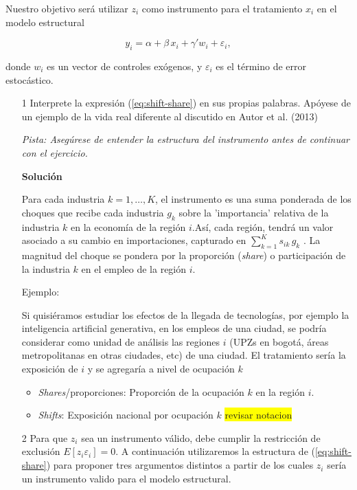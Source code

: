 \documentclass[a4paper, answers, addpoints, 11pt]{exam}
\newenvironment{solucion}{%
  \begin{mdframed}[
    backgroundcolor=blue!5,    %
    linecolor=blue!50,          %
    linewidth=2pt,              %
    leftmargin=10pt,            %
    rightmargin=8pt,           %
    topline=true,              %
    bottomline=true,            %
    roundcorner=10pt,           %
    innerleftmargin=10pt,       %
    innerrightmargin=10pt,      %
    innerbottommargin=10pt,     %
    innertopmargin=10pt         %
  ]%
  \begin{tcolorbox}[colframe=blue!50!black, colback=blue!50, coltitle=white, sharp corners=all, boxrule=1mm, width=\textwidth, halign=left, valign=center, top=0mm, bottom=0mm, left=0mm, right=0mm] \textbf{Solución} \end{tcolorbox} }{\end{mdframed}}
\begin{document}
Nuestro objetivo será utilizar \(z_i\) como instrumento para el tratamiento \(x_i\) en el modelo estructural

\[
y_i = \alpha +\beta\,x_i + \gamma' w_i + \varepsilon_i,
\]

donde \(w_i\) es un vector de controles exógenos, y \(\varepsilon_i\) es el término de error estocástico.

\begin{enumerate}
    \item[1] Interprete la expresión (\ref{eq:shift-share}) en sus propias palabras. Apóyese de un ejemplo de la vida real diferente al discutido en Autor et al. (2013)
    
    
    \textit{Pista: Asegúrese de entender la estructura del instrumento antes de continuar con el ejercicio.}
\begin{solucion}
Para cada industria $k=1,\dots,K$, el instrumento es una suma ponderada de los choques que recibe cada industria $g_k$ sobre la 'importancia'  relativa de la industria $k$ en la economía de la región $i$.Así, cada región, tendrá un valor asociado a su cambio en importaciones, capturado en $\sum_{k=1}^{K} s_{ik}\,g_k$ . La magnitud del choque se pondera por la proporción (\textit{share}) o participación de la industria $k$ en el empleo de la región $i$. 

Ejemplo:

Si quisiéramos estudiar los efectos de la llegada de tecnologías, por ejemplo la inteligencia artificial generativa, en los empleos de una ciudad, se podría considerar como unidad de análisis las regiones $i$ (UPZs en bogotá, áreas metropolitanas en otras ciudades, etc) de una ciudad. El tratamiento sería la exposición de $i$ y se agregaría a nivel de ocupación $k$
\begin{itemize}
    \item \textit{Shares}/proporciones: Proporción de la ocupación $k$ en la región $i$.
    \item \textit{Shifts}: Exposición nacional por ocupación $k$
    \colorbox{yellow}{revisar notacion}
\end{itemize}

\end{solucion}

    \item[2] Para que $z_i$ sea un instrumento válido, debe cumplir la restricción de exclusión $E[z_i \varepsilon_i] = 0$. A continuación utilizaremos la estructura de (\ref{eq:shift-share}) para proponer tres argumentos distintos a partir de los cuales $z_i$ sería un instrumento valido para el modelo estructural. \\
        

\end{enumerate}
\end{document}
